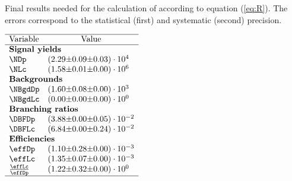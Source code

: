  
\begin{table}[h]
    \centering
    \caption{Final results needed for the calculation of \R according to equation (\ref{eq:R}). The errors correspond to the statistical (first) and systematic (second) precision.}
    \label{tab:table_finalresults.tex}
    $\begin{array}{lr@{\pm}r@{\pm}l}
    \hline
    \text{Variable} & \multicolumn{3}{c}{\text{Value}} \\
    \hline
\multicolumn{4}{l}{\text{\textbf{Signal yields}}} \\
\NDp&(2.29 & 0.09 & 0.03) \cdot 10^{4}\\
\NLc&(1.58 & 0.01 & 0.00) \cdot 10^{6}\\
\multicolumn{4}{l}{\text{\textbf{Backgrounds}}} \\
\NBgdDp&(1.60 & 0.08 & 0.00) \cdot 10^{3}\\
\NBgdLc&(0.00 & 0.00 & 0.00) \cdot 10^{0}\\
\multicolumn{4}{l}{\text{\textbf{Branching ratios}}} \\
\DBFDp&(3.88 & 0.00 & 0.05) \cdot 10^{-2}\\
\DBFLc&(6.84 & 0.00 & 0.24) \cdot 10^{-2}\\
\multicolumn{4}{l}{\text{\textbf{Efficiencies}}} \\
\effDp&(1.10 & 0.28 & 0.00) \cdot 10^{-3}\\
\effLc&(1.35 & 0.07 & 0.00) \cdot 10^{-3}\\
\frac{\effLc}{\effDp}&(1.22 & 0.32 & 0.00) \cdot 10^{0}\\

    \hline
    \end{array}$
\end{table}
